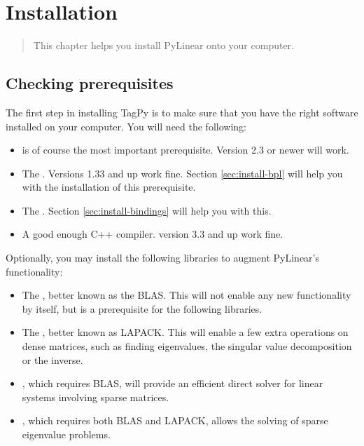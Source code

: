 \chapter{Installation}
\label{cha:installation}

\begin{quote}
   This chapter helps you install PyLinear onto your computer.
\end{quote}

\section{Checking prerequisites}

The first step in installing TagPy is to make sure that you have the
right software installed on your computer. You will need the
following:

\begin{itemize}
  \item {} is of course
    the most important prerequisite. Version 2.3 or newer will work.
  \item The . 
    Versions 1.33 and up work fine. Section \ref{sec:install-bpl}
    will help you with the installation of this prerequisite.
  \item The
    . Section \ref{sec:install-bindings} will
    help you with this.
  \item A good enough C++ compiler. 
    version 3.3 and up work fine.
\end{itemize}

Optionally, you may install the following libraries to augment
PyLinear's functionality:

\begin{itemize}
  \item The , better known as the BLAS. This will
    not enable any new functionality by itself, but is a
    prerequisite for the following libraries.
  \item The , better known as LAPACK. This will enable a few
    extra operations on dense matrices, such as finding eigenvalues,
    the singular value decomposition or the inverse.
  \item {},
    which requires BLAS, will provide an efficient direct solver
    for linear systems involving sparse matrices.
  \item {},
    which requires both BLAS and LAPACK, allows the solving of
    sparse eigenvalue problems.
\end{itemize}

